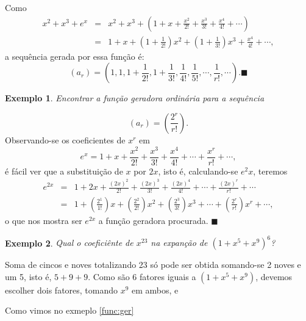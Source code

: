 \documentclass[a4paper,12pt]{book}
\newtheorem{exemplo}{Exemplo}[chapter]
\begin{document}
Como
\begin{eqnarray}
x^2+x^3+e^x & = & x^2+x^3+\left(1+x+\frac{x^2}{2!}+\frac{x^3}{3!}+\frac{x^4}{4!}+\cdots \right) \nonumber \\
& = & 1+x+\left(1+ \frac{1}{2!} \right)x^2+\left(1+ \frac{1}{3!} \right)x^3+\frac{x^4}{4!}+ \cdots , \nonumber 
\end{eqnarray}
a sequência gerada por essa função é:
$$(a_r) = \left( 1,1,1+\frac{1}{2!},1+\frac{1}{3!},\frac{1}{4!},\frac{1}{5!},\cdots,\frac{1}{r!},\cdots \right).\blacksquare$$
\begin{exemplo}
Encontrar a função geradora ordinária para a sequência
\end{exemplo}
$$ (a_r) =\left(\frac{2^r}{r!}\right).$$
Observando-se os coeficientes de $x^r$ em 
$$e^x=1+x+\frac{x^2}{2!}+\frac{x^3}{3!}+\frac{x^4}{4!}+\cdots +\frac{x^r}{r!}+\cdots ,$$
é fácil ver que a substituição de $x$ por $2x$, isto é, calculando-se $e^2x$, teremos
\begin{eqnarray}
e^{2x} &=& 1+2x+\frac{{(2x)}^2}{2!}+\frac{{(2x)}^3}{3!}+\frac{{(2x)}^4}{4!}+\cdots +\frac{{(2x)}^r}{r!}+\cdots \nonumber \\
&=& 1+ \left( \frac {2^1}{1!} \right)x+\left( \frac {2^2}{2!} \right)x^2+\left( \frac {2^3}{3!} \right)x^3+\cdots +\left( \frac {2^r}{r!} \right)x^r+ \cdots , \nonumber
\end{eqnarray}
o que nos mostra ser $e^{2x}$ a função geradora procurada. $\blacksquare$
\begin{exemplo}
Qual o coeficiênte de $x^{23}$ na expanção de ${(1+x^5+x^9)}^6$?
\end{exemplo}
Soma de cincos e noves totalizando 23 só pode ser obtida somando-se 2 noves e um 5, isto é, $5+9+9$. Como são 6 fatores iguais a $(1+x^5+x^9)$, devemos escolher dois fatores, tomando $x^9$ em ambos, e

Como vimos no exmeplo \ref{func:ger}
\end{document}
